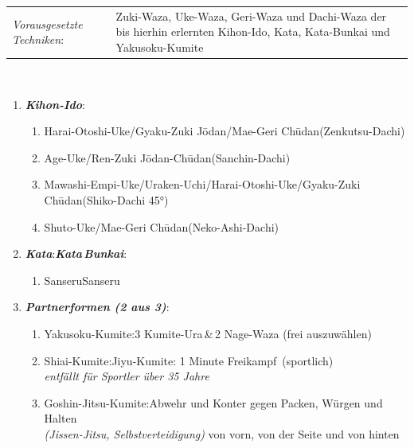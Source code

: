 \documentclass[a5paper,landscape,DIV=calc,11pt,notitlepage]{scrartcl}
\begin{document}
\pagebreak
\begin{tcolorbox}[colback=white,colframe=black,coltitle=white,adjusted title=1. Dan: Schwarz]
	\renewcommand{\labelenumi}{\alph{enumi}.)}
	\renewcommand{\labelenumii}{\arabic*.}
	{\scriptsize 
		\begin{tabularx}{\textwidth}{lX}
			\textit{Vorausgesetzte Techniken}:& Zuki-Waza, Uke-Waza, Geri-Waza und Dachi-Waza der bis hierhin erlernten Kihon-Ido, Kata, Kata-Bunkai und Yakusoku-Kumite
		\end{tabularx}\\}
	\begin{enumerate}[nosep]
		\item \textit{\textbf{Kihon-Ido}}:
		\begin{enumerate}[nosep]
			\item Harai-Otoshi-Uke/Gyaku-Zuki J\={o}dan/Mae-Geri Ch\={u}dan\tabto{335pt}(Zenkutsu-Dachi)
			\item Age-Uke/Ren-Zuki J\={o}dan-Ch\={u}dan\tabto{335pt}(Sanchin-Dachi)
			\item Mawashi-Empi-Uke/Uraken-Uchi/Harai-Otoshi-Uke/Gyaku-Zuki Ch\={u}dan\tabto{335pt}(Shiko-Dachi 45°)
			\item Shuto-Uke/Mae-Geri Ch\={u}dan\tabto{335pt}(Neko-Ashi-Dachi)
		\end{enumerate}
		\vspace{12pt}
		\item \textit{\textbf{Kata}}:\tabto{200pt}\textit{\textbf{Kata\,Bunkai}}:
		\begin{enumerate}[nosep]
			\item Sanseru\tabto{200pt}Sanseru
		\end{enumerate}
		\vspace{12pt}
		\item \textit{\textbf{Partnerformen (2 aus 3)}}:
		\begin{enumerate}[nosep]
			\item Yakusoku-Kumite:\tabto{200pt}3 Kumite-Ura\,\&\,2 Nage-Waza (frei auszuwählen)
			\item Shiai-Kumite:\tabto{200pt}Jiyu-Kumite: 1 Minute \frqq Freikampf\flqq~(sportlich)\\\tabto{200pt}\textit{entfällt für Sportler über 35 Jahre}
			\item Goshin-Jitsu-Kumite:\tabto{200pt}Abwehr und Konter gegen Packen, Würgen und Halten\\\textit{(Jissen-Jitsu, Selbstverteidigung)}\tabto{200pt} von vorn, von der Seite und von hinten

\end{enumerate}
\end{enumerate}
\end{tcolorbox}
\end{document}

